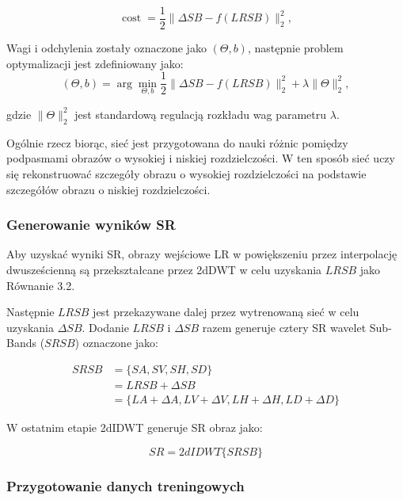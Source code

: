 \begin{equation}
    \operatorname{cost}=\frac{1}{2}\|\Delta SB-f(LRSB)\|_2^2,
\end{equation}


Wagi i odchylenia zostały oznaczone jako $(\Theta, b)$, następnie problem optymalizacji jest zdefiniowany jako:
\begin{equation}
    (\Theta, {b})=\arg \min _{\Theta, {b}} \frac{1}{2}\|\Delta SB-f(LRSB)\|_2^2+\lambda\|\Theta\|_2^2,
\end{equation}

gdzie $\|\Theta\|_2^2$ jest standardową regulacją rozkładu wag parametru $\lambda$.

Ogólnie rzecz biorąc, sieć jest przygotowana do nauki różnic pomiędzy podpasmami obrazów o wysokiej i niskiej rozdzielczości. W ten sposób sieć uczy się rekonstruować szczegóły obrazu o wysokiej rozdzielczości na podstawie szczegółów obrazu o niskiej rozdzielczości.

\subsubsection*{Generowanie wyników SR}
Aby uzyskać wyniki SR, obrazy wejściowe LR w powiększeniu przez interpolację dwusześcienną są przekształcane przez 2dDWT w celu uzyskania $LRSB$ jako Równanie 3.2.

Następnie $LRSB$ jest przekazywane dalej przez wytrenowaną sieć w celu uzyskania $\Delta SB$. Dodanie $LRSB$ i $\Delta SB$ razem generuje cztery SR wavelet Sub-Bands ($SRSB$) oznaczone jako:

\begin{equation}
    \begin{aligned}
    SRSB    & =\{SA, SV, SH, SD\} \\
            & =LRSB+\Delta SB \\
            & =\{LA+\Delta A, LV+\Delta V, LH+\Delta H, LD+\Delta D\}
\end{aligned}
\end{equation}

W ostatnim etapie 2dIDWT generuje SR obraz jako:

\begin{equation}
    SR=2dIDWT\{SRSB\}
\end{equation}

\subsubsection*{Przygotowanie danych treningowych}


